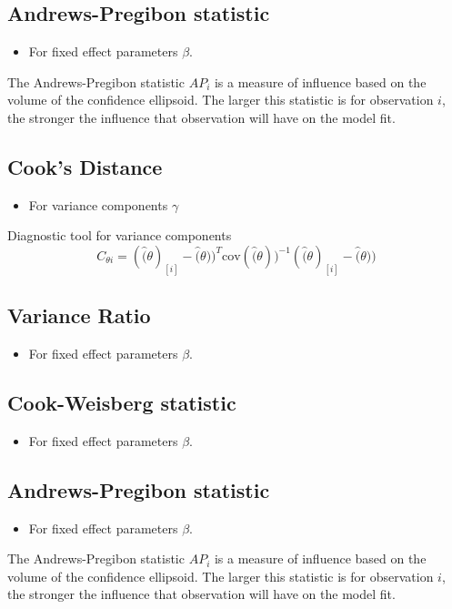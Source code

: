 \documentclass[12pt, a4paper]{report}
\theoremstyle{plain}
\theoremstyle{definition}
\theoremstyle{remark}
\begin{document}
	\subsection{Andrews-Pregibon statistic} %
	\begin{itemize}
		\item For fixed effect parameters $\beta$.
	\end{itemize}
	The Andrews-Pregibon statistic $AP_{i}$ is a measure of influence based on the volume of the confidence ellipsoid.
	The larger this statistic is for observation $i$, the stronger the influence that observation will have on the model fit.
	
	
	\subsection{Cook's Distance} %
	\begin{itemize}
		\item For variance components $\gamma$
	\end{itemize}
	
	Diagnostic tool for variance components
	\[ C_{\theta i} =(\hat(\theta)_{[i]} - \hat(\theta))^{T}\mbox{cov}( \hat(\theta))^{-1}(\hat(\theta)_{[i]} - \hat(\theta))\]
	
	
	\subsection{Variance Ratio} %
	\begin{itemize}
		\item For fixed effect parameters $\beta$.
	\end{itemize}
	
	
	\subsection{Cook-Weisberg statistic} %
	\begin{itemize}
		\item For fixed effect parameters $\beta$.
	\end{itemize}
	
	\subsection{Andrews-Pregibon statistic} %
	\begin{itemize}
		\item For fixed effect parameters $\beta$.
	\end{itemize}
	The Andrews-Pregibon statistic $AP_{i}$ is a measure of influence based on the volume of the confidence ellipsoid.
	The larger this statistic is for observation $i$, the stronger the influence that observation will have on the model fit.
	
\end{document}
